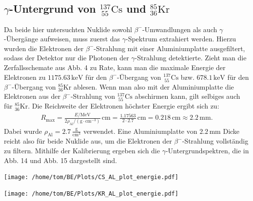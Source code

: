 \documentclass[german,  %
parskip=full,  %
]{scrartcl}
\begin{document}
\subsection{\(\gamma\)-Untergrund von \(^{137}_{\ 55}\mathrm{Cs}\) und \(^{85}_{36}\mathrm{Kr}\)}
Da beide hier untersuchten Nuklide sowohl \(\beta^-\)-Umwandlungen als auch \(\gamma\)-Übergänge aufweisen, muss zuerst das \(\gamma\)-Spektrum extrahiert werden. Hierzu wurden die Elektronen der \(\beta^-\)-Strahlung mit einer Aluminiumplatte ausgefiltert, sodass der Detektor nur die Photonen der \(\gamma\)-Strahlung detektierte. Zieht man die Zerfallsschemate aus Abb. 4 zu Rate, kann man die maximale Energie der Elektronen zu \(1175.63\,\mathrm{keV}\) für den \(\beta^-\)-Übergang von \(^{137}_{\ 55}\mathrm{Cs}\) bzw. \(678.1\,\mathrm{keV}\) für den \(\beta^-\)-Übergang von \(^{85}_{ 36}\mathrm{Kr}\) ablesen. Wenn man also mit der Aluminiumplatte die Elektronen aus der \(\beta^-\)-Strahlung von \(^{137}_{\ 55}\mathrm{Cs}\) abschirmen kann, gilt selbiges auch für \(^{85}_{36}\mathrm{Kr}\).
Die Reichweite der Elektronen höchster Energie ergibt sich zu:
\begin{align*}
R_{\mathrm{max}} = \frac{E/\mathrm{MeV}}{2\rho_{\mathrm{Al}}/(\mathrm{g}\cdot\mathrm{cm}^{-3})}\,\mathrm{cm} = \frac{1.17563}{2\cdot 2.7}\,\mathrm{cm} = 0.218\,\mathrm{cm} \approx 2.2\,\mathrm{mm}.
\end{align*}
Dabei wurde \(\rho_{\mathrm{Al}} = 2.7\,\frac{\mathrm{g}}{\mathrm{cm}^3}\) verwendet.
Eine Aluminiumplatte von \(2.2\,\mathrm{mm}\) Dicke reicht also für beide Nuklide aus, um die Elektronen der \(\beta^-\)-Strahlung vollständig zu filtern. Mithilfe der Kalibrierung ergeben sich die \(\gamma\)-Untergrundspektren, die in Abb. 14 und Abb. 15 dargestellt sind. \\
\begin{minipage}{0.5\textwidth}\centering
\texttt{[image: /home/tom/BE/Plots/CS\_AL\_plot\_energie.pdf]}
\end{minipage}
\begin{minipage}{0.5\textwidth}\centering
\texttt{[image: /home/tom/BE/Plots/KR\_AL\_plot\_energie.pdf]}
\end{minipage} \\\\
\end{document}
